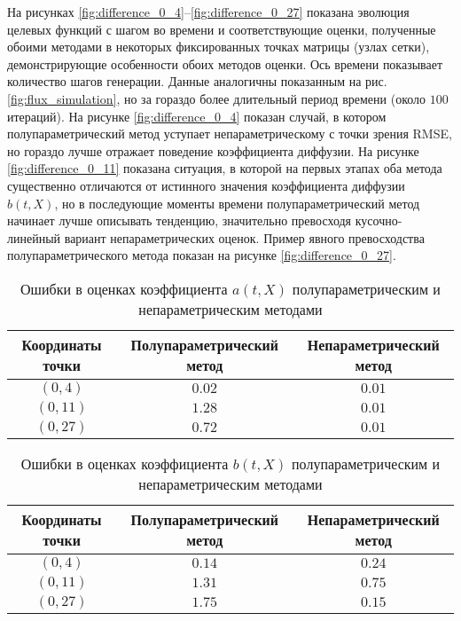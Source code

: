На рисунках \ref{fig:difference_0_4}--\ref{fig:difference_0_27} показана эволюция целевых функций с шагом во времени и соответствующие оценки, полученные обоими методами в некоторых фиксированных точках матрицы (узлах сетки), демонстрирующие особенности обоих методов оценки. Ось времени показывает количество шагов генерации. Данные аналогичны показанным на рис. \ref{fig:flux_simulation}, но за гораздо более длительный период времени (около $100$ итераций).
На рисунке \ref{fig:difference_0_4} показан случай, в котором полупараметрический метод уступает непараметрическому с точки зрения RMSE, но гораздо лучше отражает поведение коэффициента диффузии. На рисунке \ref{fig:difference_0_11} показана ситуация, в которой на первых этапах оба метода существенно отличаются от истинного значения коэффициента диффузии $b(t,X)$, но в последующие моменты времени полупараметрический метод начинает лучше описывать тенденцию, значительно превосходя кусочно-линейный вариант непараметрических оценок. Пример явного превосходства полупараметрического метода показан на рисунке \ref{fig:difference_0_27}.

\begin{table}[h!]
	\centering
	\caption{Ошибки в оценках коэффициента $a(t,X)$ полупараметрическим и непараметрическим методами}
	\begin{tabular}{|c|c|c|}
		\hline
		Координаты точки & Полупараметрический метод & Непараметрический метод \\
		\hline
		$(0, 4)$ & $0.02$ & $0.01$ \\
		$(0, 11)$ & $1.28$ & $0.01$ \\
		$(0, 27)$ & $0.72$ & $0.01$ \\
		\hline
	\end{tabular}
	\label{tab:errors_estimation_a}
\end{table}

\begin{table}[h!]
	\centering
	\caption{Ошибки в оценках коэффициента $b(t,X)$ полупараметрическим и непараметрическим методами}
	\begin{tabular}{|c|c|c|}
		\hline
		Координаты точки & Полупараметрический метод & Непараметрический метод \\
		\hline
		$(0, 4)$ & $0.14$ & $0.24$ \\
		$(0, 11)$ & $1.31$ & $0.75$ \\
		$(0, 27)$ & $1.75$ & $0.15$ \\
		\hline
	\end{tabular}
	\label{tab:errors_estimation_b}
\end{table}

